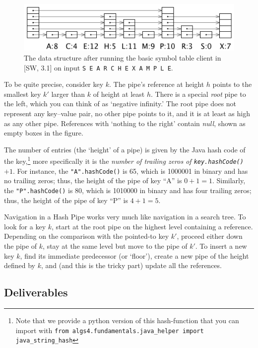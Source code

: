 \documentclass{tufte-handout}
\begin{document}
\begin{figure}
  \includegraphics[width=\textwidth]{img/full.png}
  \caption{The data structure after running the basic symbol table client in [SW, 3.1] on input {\tt S E A R C H E X A M P L E}.}
\end{figure}

To be quite precise, consider key $k$.
The pipe's reference at height $h$ points to the smallest key $k'$ larger than $k$ of height at least $h$.
There is a special \emph{root} pipe to the left, which you can think of as `negative infinity.' 
The root pipe does not represent any key--value pair, no other pipe points to it, and it is at least as high as any other pipe.
References with `nothing to the right' contain \emph{null}, shown as empty boxes in the figure.

The number of entries (the `height' of a pipe) is given by the Java hash code of the key,\footnote{Note that we provide a python version of this hash-function that you can import with \texttt{from algs4.fundamentals.java\_helper import java\_string\_hash}}
more specifically it is the \emph{number of trailing zeros of {\tt key.hashCode()} $+1$}.
For instance, the {\tt "A".hashCode()} is 65, which is 1000001 in binary and has no trailing zeros; thus, the height of the pipe of key ``A'' is $0+1=1$.
Similarly, the {\tt "P".hashCode()} is 80, which is 1010000 in binary and has four trailing zeros; thus, the height of the pipe of key ``P'' is $4+1=5$.

Navigation in a Hash Pipe works very much like navigation in a search tree.
To look for a key $k$, start at the root pipe on the highest level containing a reference.
Depending on the comparison with the pointed-to key $k'$, proceed either down the pipe of $k$, stay at the same level but move to the pipe of $k'$.
To insert a new key $k$, find its immediate predecessor (or `floor'), create a new pipe of the height defined by $k$, and (and this is the tricky part) update all the references.

\subsection{Deliverables}
\end{document}
